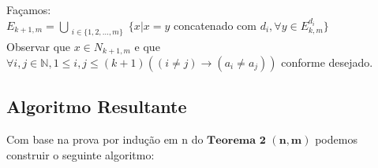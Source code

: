 \documentclass[twoside]{article}
\begin{document}
\begin{multicols}{2}
Façamos:\\
 $E_{k+1,m} = \bigcup_{\substack{ i \in \{1,2,\dots,m\}}} \{ x | x = y$ concatenado com $d_i, \forall y \in E_{k,m}^{d_i}  \}$\\

Observar que $x \in N_{k+1,m}$ e que $\forall i,j \in \mathbb{N}, 1 \leq i,j \leq (k+1) ((i \neq j) \rightarrow ( a_i \neq a_j ))$ conforme desejado.\\


\subsection{ Algoritmo Resultante }
\indent 
Com base na prova por indução em n do $\mathbf{Teorema}$ $\mathbf{2}$ $\mathbf{(n,m)}$ podemos construir o seguinte algoritmo:\\


\end{multicols}
\end{document}
